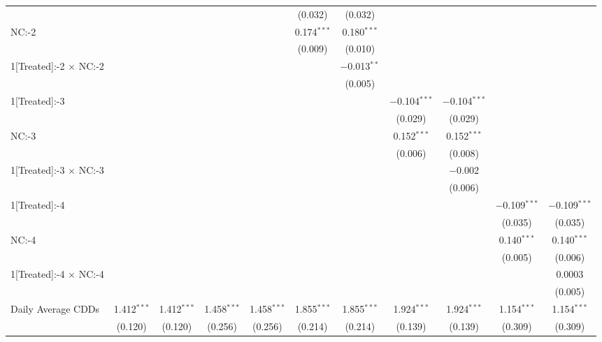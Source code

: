 \begin{table}[!htbp]
\begin{adjustbox}{scale = 0.75}
\begin{tabular}{@{\extracolsep{5pt}}lcccccccccc}
  &  &  &  &  & (0.032) & (0.032) &  &  &  &  \\ 
 NC:-2 &  &  &  &  & 0.174$^{***}$ & 0.180$^{***}$ &  &  &  &  \\ 
  &  &  &  &  & (0.009) & (0.010) &  &  &  &  \\ 
 1[Treated]:-2 $\times$ NC:-2 &  &  &  &  &  & $-$0.013$^{**}$ &  &  &  &  \\ 
  &  &  &  &  &  & (0.005) &  &  &  &  \\ 
 1[Treated]:-3 &  &  &  &  &  &  & $-$0.104$^{***}$ & $-$0.104$^{***}$ &  &  \\ 
  &  &  &  &  &  &  & (0.029) & (0.029) &  &  \\ 
 NC:-3 &  &  &  &  &  &  & 0.152$^{***}$ & 0.152$^{***}$ &  &  \\ 
  &  &  &  &  &  &  & (0.006) & (0.008) &  &  \\ 
 1[Treated]:-3 $\times$ NC:-3 &  &  &  &  &  &  &  & $-$0.002 &  &  \\ 
  &  &  &  &  &  &  &  & (0.006) &  &  \\ 
 1[Treated]:-4 &  &  &  &  &  &  &  &  & $-$0.109$^{***}$ & $-$0.109$^{***}$ \\ 
  &  &  &  &  &  &  &  &  & (0.035) & (0.035) \\ 
 NC:-4 &  &  &  &  &  &  &  &  & 0.140$^{***}$ & 0.140$^{***}$ \\ 
  &  &  &  &  &  &  &  &  & (0.005) & (0.006) \\ 
 1[Treated]:-4 $\times$ NC:-4 &  &  &  &  &  &  &  &  &  & 0.0003 \\ 
  &  &  &  &  &  &  &  &  &  & (0.005) \\ 
 Daily Average CDDs & 1.412$^{***}$ & 1.412$^{***}$ & 1.458$^{***}$ & 1.458$^{***}$ & 1.855$^{***}$ & 1.855$^{***}$ & 1.924$^{***}$ & 1.924$^{***}$ & 1.154$^{***}$ & 1.154$^{***}$ \\ 
  & (0.120) & (0.120) & (0.256) & (0.256) & (0.214) & (0.214) & (0.139) & (0.139) & (0.309) & (0.309) \\ 

\end{tabular}
\end{adjustbox}
\end{table}
